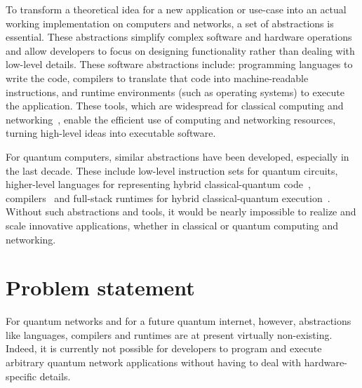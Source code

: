 To transform a theoretical idea for a new application or use-case into an actual working implementation on computers and networks, a set of abstractions is essential.
These abstractions simplify complex software and hardware operations and allow developers to focus on designing functionality rather than dealing with low-level details.
These software abstractions include: programming languages to write the code, compilers to translate that code into machine-readable instructions, and runtime environments (such as operating systems) to execute the application.
These tools, which are widespread for classical computing and networking~\cite{aho_compilers_2006, silberschatz_book_2014, james_computer_2016}, enable the efficient use of computing and networking resources, turning high-level ideas into executable software.

For quantum computers, similar abstractions have been developed, especially in the last decade.
These include low-level instruction sets \cite{larose_overview_2019} for quantum circuits, higher-level languages for representing hybrid classical-quantum code~\cite{heim_quantum_2020}, compilers~\cite{chong_programming_2017} and full-stack runtimes for hybrid classical-quantum execution~\cite{bandic_full-stack_2022}.
Without such abstractions and tools, it would be nearly impossible to realize and scale innovative applications, whether in classical or quantum computing and networking.




\section{Problem statement}
For quantum networks and for a future quantum internet, however, abstractions like languages, compilers and runtimes are at present virtually non-existing.
Indeed, it is currently not possible for developers to program and execute arbitrary quantum network applications without having to deal with hardware-specific details.

